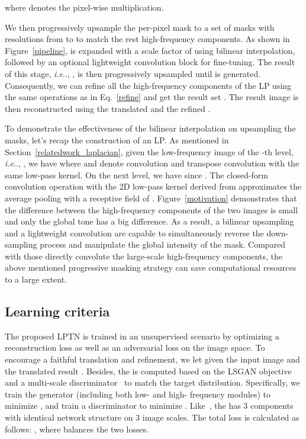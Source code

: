 \documentclass[10pt,twocolumn,letterpaper]{article}
\makeatletter
\DeclareRobustCommand\onedot{\futurelet\@let@token\@onedot}
\def\@onedot{\ifx\@let@token.\else.\null\fi\xspace}
\def\ie{\emph{i.e}\onedot} \def\Ie{\emph{I.e}\onedot}
\makeatother
\begin{document}
	where  denotes the pixel-wise multiplication.
	
	We then progressively upsample the per-pixel mask  to a set of masks  with resolutions from  to  to match the rest high-frequency components. As shown in Figure~\ref{pipeline},  is expanded with a scale factor of  using bilinear interpolation, followed by an optional lightweight convolution block for fine-tuning. The result of this stage, \ie, , is then progressively upsampled until  is generated. Consequently, we can refine all the high-frequency components of the LP using the same operations as in Eq.~\eqref{refine} and get the result set . The result image  is then reconstructed using the translated  and the refined .
	
	To demonstrate the effectiveness of the bilinear interpolation on upsampling the masks, let's recap the construction of an LP. As mentioned in Section~\ref{relatedwork_laplacian}, given the low-frequency image of the -th level, \ie, , we have  where  and  denote convolution and transpose convolution with the same low-pass kernel. On the next level, we have  since . The closed-form convolution operation  with the 2D low-pass kernel derived from  approximates the average pooling with a receptive field of . Figure~\ref{motivation} demonstrates that the difference between the high-frequency components of the two images is small and only the global tone has a big difference. As a result, a bilinear upsampling and a lightweight convolution are capable to simultaneously reverse the down-sampling process and manipulate the global intensity of the mask. Compared with those directly convolute the large-scale high-frequency components, the above mentioned progressive masking strategy can save computational resources to a large extent.
	
	\subsection{Learning criteria}
	
	The proposed LPTN is trained in an unsupervised scenario by optimizing a reconstruction loss  as well as an adversarial loss  on the image space. To encourage a faithful translation and refinement, we let  given the input image  and the translated result . Besides, the  is computed based on the LSGAN objective~\cite{mao2017least} and a multi-scale discriminator~\cite{wang2018high} to match the target distribution. Specifically, we train the generator  (including both low- and high- frequency modules) to minimize , and train a discriminator  to minimize . Like~\cite{mao2017least}, the  has 3 components with identical network structure on 3 image scales. The total loss is calculated as follows: , where  balances the two losses.
\end{document}
